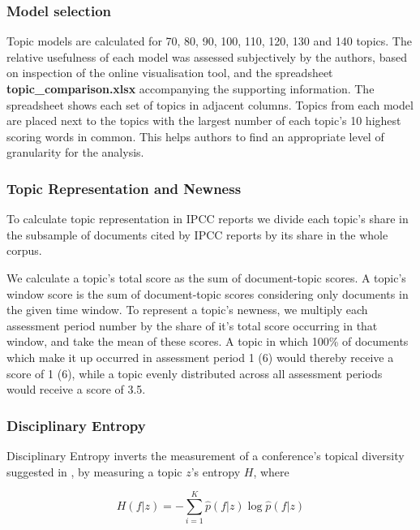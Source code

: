 \documentclass{article}
\begin{document}
\begin{linenumbers}
	\subsubsection*{Model selection}
	
	Topic models are calculated for 70, 80, 90, 100, 110, 120, 130 and 140 topics. The relative usefulness of each model was assessed subjectively by the authors, based on inspection of the online visualisation tool, and the spreadsheet \textbf{topic\_comparison.xlsx} accompanying the supporting information. The spreadsheet shows each set of topics in adjacent columns. Topics from each model are placed next to the topics with the largest number of each topic's 10 highest scoring words in common. This helps authors to find an appropriate level of granularity for the analysis. 
			
	\subsubsection*{Topic Representation and Newness}
	
	To calculate topic representation in IPCC reports we divide each topic's share in the subsample of documents cited by IPCC reports by its share in the whole corpus. 
	
	We calculate a topic's total score as the sum of document-topic scores. A topic's window score is the sum of document-topic scores considering only documents in the given time window. To represent a topic's newness, we multiply each assessment period number by the share of it's total score occurring in that window, and take the mean of these scores. A topic in which 100\% of documents which make it up occurred in assessment period 1 (6) would thereby receive a score of 1 (6), while a topic evenly distributed across all assessment periods would receive a score of 3.5.
	
	
	\subsubsection*{Disciplinary Entropy}
	
	Disciplinary Entropy inverts the measurement of a conference's topical diversity suggested in \cite{Hall2008}, by measuring a topic \(z\)'s entropy \(H\), where 
	
	\begin{equation}
		H(f|z) = -\sum_{i=1}^K \hat{p}(f|z) \log \hat{p}(f|z) 
	\end{equation}
	

\end{linenumbers}
\end{document}
